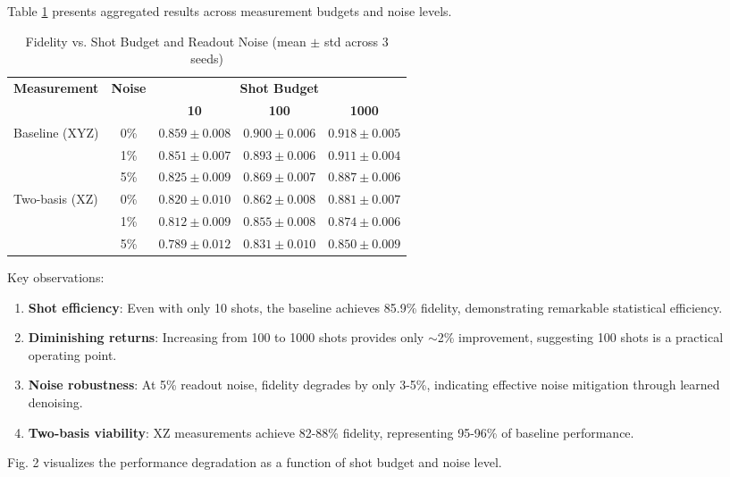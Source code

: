 \documentclass[conference]{IEEEtran}
\begin{document}
Table \ref{tab:shots_noise} presents aggregated results across measurement budgets and noise levels.

\begin{table}[t]
\centering
\caption{Fidelity vs. Shot Budget and Readout Noise (mean $\pm$ std across 3 seeds)}
\label{tab:shots_noise}
\scriptsize
\begin{tabular}{lcccc}
\toprule
\multirow{2}{*}{\textbf{Measurement}} & \multirow{2}{*}{\textbf{Noise}} & \multicolumn{3}{c}{\textbf{Shot Budget}} \\
\cmidrule{3-5}
& & \textbf{10} & \textbf{100} & \textbf{1000} \\
\midrule
\multirow{3}{*}{Baseline (XYZ)} 
& 0\% & $0.859 \pm 0.008$ & $0.900 \pm 0.006$ & $0.918 \pm 0.005$ \\
& 1\% & $0.851 \pm 0.007$ & $0.893 \pm 0.006$ & $0.911 \pm 0.004$ \\
& 5\% & $0.825 \pm 0.009$ & $0.869 \pm 0.007$ & $0.887 \pm 0.006$ \\
\midrule
\multirow{3}{*}{Two-basis (XZ)} 
& 0\% & $0.820 \pm 0.010$ & $0.862 \pm 0.008$ & $0.881 \pm 0.007$ \\
& 1\% & $0.812 \pm 0.009$ & $0.855 \pm 0.008$ & $0.874 \pm 0.006$ \\
& 5\% & $0.789 \pm 0.012$ & $0.831 \pm 0.010$ & $0.850 \pm 0.009$ \\
\bottomrule
\end{tabular}
\end{table}

Key observations:
\begin{enumerate}
    \item \textbf{Shot efficiency}: Even with only 10 shots, the baseline achieves 85.9\% fidelity, demonstrating remarkable statistical efficiency.
    \item \textbf{Diminishing returns}: Increasing from 100 to 1000 shots provides only $\sim$2\% improvement, suggesting 100 shots is a practical operating point.
    \item \textbf{Noise robustness}: At 5\% readout noise, fidelity degrades by only 3-5\%, indicating effective noise mitigation through learned denoising.
    \item \textbf{Two-basis viability}: XZ measurements achieve 82-88\% fidelity, representing 95-96\% of baseline performance.
\end{enumerate}

Fig. 2 visualizes the performance degradation as a function of shot budget and noise level.
\end{document}
